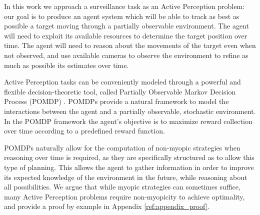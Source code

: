 
In this work we approach a surveillance task as an Active Perception problem: our goal is to produce
an agent system which will be able to track as best as possible a target moving through a partially
observable environment. The agent will need to exploit its available resources to determine the
target position over time. The agent will need to reason about the movements of the target even when
not observed, and use available cameras to observe the environment to refine as much as possible its
estimates over time.


Active Perception tasks can be conveniently modeled through a powerful and flexible
decision-theoretic tool, called Partially Observable Markov Decision Process (POMDP)
\cite{cit:pomdp}. POMDPs provide a natural framework to model the interactions between the agent and
a partially observable, stochastic environment.  In the POMDP framework the agent's objective is to
maximize reward collection over time according to a predefined reward function.

POMDPs naturally allow for the computation of non-myopic strategies when reasoning over time is
required, as they are specifically structured as to allow this type of planning. This allows the
agent to gather information in order to improve its expected knowledge of the environment in the
future, while reasoning about all possibilities. We argue that while myopic strategies can sometimes
suffice, many Active Perception problems require non-myopicity to achieve optimality, and provide a
proof by example in Appendix \ref{ref:appendix_proof}.

%


